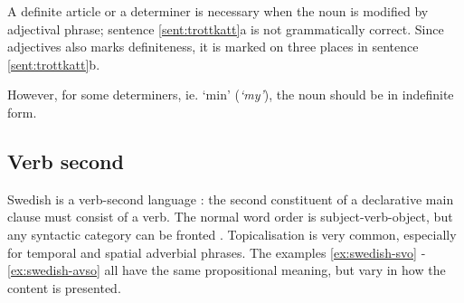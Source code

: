 \documentclass{report}
\begin{document}
A definite article or a determiner is necessary when the noun is modified by adjectival
phrase; sentence \ref{sent:trottkatt}a is not grammatically correct.
Since adjectives also marks definiteness, it is marked on three places
in sentence \ref{sent:trottkatt}b. %

\label{sent:trottkatt}
However, for some determiners, ie. `min' (\emph{`my'}), the noun should be in indefinite form.

\enumsentence{\longexnt{3}{3}
{Min &trötta& katt.} %
{`My & tired & cat'}
{ $[${\sc+def}$]$ &$[${\sc+def}$]$& $[${\sc-def}$]$} %
{}}



\subsection*{Verb second}
Swedish is a verb-second language \cite[p.116]{gunlog}: the
second constituent of a declarative main clause must consist of a verb.
The normal word order is subject-verb-object, but any syntactic category can be
fronted \cite[]{H&H}.
Topicalisation is very common, especially for temporal and spatial adverbial phrases.
The examples \ref{ex:swedish-svo} - \ref{ex:swedish-avso} all have the same propositional
meaning, but vary in how the content is presented.
 \label{ex:swedish-svo}
\vspace{-3mm}
\label{ex:swedish-ovs} 
\vspace{-3mm}
 \label{ex:swedish-avso}
\end{document}
